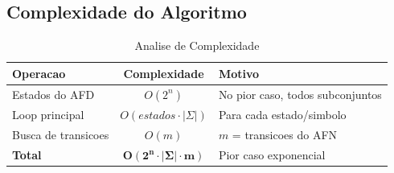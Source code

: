 \documentclass[12pt,a4paper]{article}
\begin{document}
\subsection{Complexidade do Algoritmo}

\begin{table}[h]
\centering
\begin{tabular}{|l|c|l|}
\hline
\textbf{Operacao} & \textbf{Complexidade} & \textbf{Motivo} \\
\hline
Estados do AFD & $O(2^n)$ & No pior caso, todos subconjuntos \\
Loop principal & $O(estados \cdot |\Sigma|)$ & Para cada estado/simbolo \\
Busca de transicoes & $O(m)$ & $m$ = transicoes do AFN \\
\hline
\textbf{Total} & $\mathbf{O(2^n \cdot |\Sigma| \cdot m)}$ & Pior caso exponencial \\
\hline
\end{tabular}
\caption{Analise de Complexidade}
\end{table}
\end{document}
